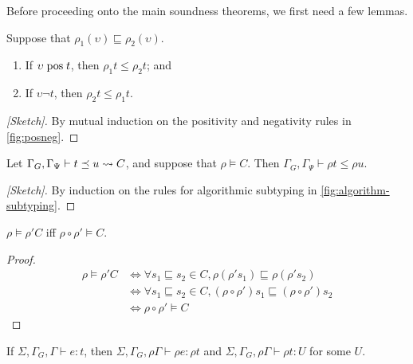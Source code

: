 Before proceeding onto the main soundness theorems, we first need a few lemmas.

\begin{lemma}
Suppose that $\rho_1(\upsilon) \sqsubseteq \rho_2(\upsilon)$.
\begin{enumerate}
  \item If $\upsilon \mathrel{\text{pos}} t$, then $\rho_1 t \leq \rho_2 t$; and
  \item If $\upsilon \neg t$, then $\rho_2 t \leq \rho_1 t$.
\end{enumerate}
\end{lemma}

\begin{proof}[{[Sketch]}]
By mutual induction on the positivity and negativity rules in \autoref{fig:posneg}.
\end{proof}

\begin{lemma}
Let $\Gamma_G, \Gamma_{\Psi} \vdash t \preceq u \rightsquigarrow C$,
and suppose that $\rho \vDash C$.
Then $\Gamma_G, \Gamma_{\Psi} \vdash \rho t \leq \rho u$.
\end{lemma}

\begin{proof}[{[Sketch]}]
By induction on the rules for algorithmic subtyping in \autoref{fig:algorithm-subtyping}.
\end{proof}


\begin{lemma}\label{lem:constraint-subst}
$\rho \vDash \rho' C$ iff $\rho \circ \rho' \vDash C$.
\end{lemma}

\begin{proof}
\begin{align*}
  \rho \vDash \rho' C
  &\Leftrightarrow \forall s_1 \sqsubseteq s_2 \in C, \rho (\rho' s_1) \sqsubseteq \rho (\rho' s_2) \\
  &\Leftrightarrow \forall s_1 \sqsubseteq s_2 \in C, (\rho \circ \rho') s_1 \sqsubseteq (\rho \circ \rho') s_2 \\
  &\Leftrightarrow \rho \circ \rho' \vDash C
\end{align*}
\end{proof}

\begin{lemma}\label{lem:typing-subst}
  If $\Sigma, \Gamma_G, \Gamma \vdash e : t$, then $\Sigma, \Gamma_G, \rho \Gamma \vdash \rho e : \rho t$ and $\Sigma, \Gamma_G, \rho \Gamma \vdash \rho t : U$ for some $U$.
\end{lemma}

